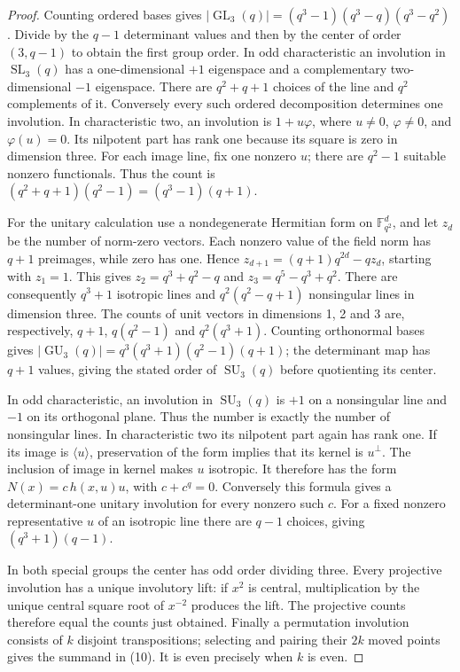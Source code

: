 \documentclass[11pt]{article}
\theoremstyle{remark}\newtheorem{remark}[theorem]{Remark}
\newcommand{\GL}{\operatorname{GL}}
\newcommand{\SL}{\operatorname{SL}}
\newcommand{\GU}{\operatorname{GU}}
\newcommand{\SU}{\operatorname{SU}}
\begin{document}
\begin{proof}
Counting ordered bases gives
$|\GL_3(q)|=(q^3-1)(q^3-q)(q^3-q^2)$. Divide by the $q-1$ determinant values and then by the center of order $(3,q-1)$ to obtain the first group order. In odd characteristic an involution in $\SL_3(q)$ has a one-dimensional $+1$ eigenspace and a complementary two-dimensional $-1$ eigenspace. There are $q^2+q+1$ choices of the line and $q^2$ complements of it. Conversely every such ordered decomposition determines one involution. In characteristic two, an involution is $1+u\varphi$, where $u\ne0$, $\varphi\ne0$, and $\varphi(u)=0$. Its nilpotent part has rank one because its square is zero in dimension three. For each image line, fix one nonzero $u$; there are $q^2-1$ suitable nonzero functionals. Thus the count is $(q^2+q+1)(q^2-1)=(q^3-1)(q+1)$.

For the unitary calculation use a nondegenerate Hermitian form on $\mathbb F_{q^2}^d$, and let $z_d$ be the number of norm-zero vectors. Each nonzero value of the field norm has $q+1$ preimages, while zero has one. Hence
$z_{d+1}=(q+1)q^{2d}-qz_d$, starting with $z_1=1$. This gives
$z_2=q^3+q^2-q$ and $z_3=q^5-q^3+q^2$. There are consequently $q^3+1$ isotropic lines and $q^2(q^2-q+1)$ nonsingular lines in dimension three. The counts of unit vectors in dimensions 1, 2 and 3 are, respectively,
$q+1$, $q(q^2-1)$ and $q^2(q^3+1)$. Counting orthonormal bases gives
$|\GU_3(q)|=q^3(q^3+1)(q^2-1)(q+1)$; the determinant map has $q+1$ values, giving the stated order of $\SU_3(q)$ before quotienting its center.

In odd characteristic, an involution in $\SU_3(q)$ is $+1$ on a nonsingular line and $-1$ on its orthogonal plane. Thus the number is exactly the number of nonsingular lines. In characteristic two its nilpotent part again has rank one. If its image is $\langle u\rangle$, preservation of the form implies that its kernel is $u^\perp$. The inclusion of image in kernel makes $u$ isotropic. It therefore has the form
$N(x)=c\,h(x,u)u$, with $c+c^q=0$. Conversely this formula gives a determinant-one unitary involution for every nonzero such $c$. For a fixed nonzero representative $u$ of an isotropic line there are $q-1$ choices, giving $(q^3+1)(q-1)$.

In both special groups the center has odd order dividing three. Every projective involution has a unique involutory lift: if $x^2$ is central, multiplication by the unique central square root of $x^{-2}$ produces the lift. The projective counts therefore equal the counts just obtained. Finally a permutation involution consists of $k$ disjoint transpositions; selecting and pairing their $2k$ moved points gives the summand in (10). It is even precisely when $k$ is even.
\end{proof}
\end{document}

